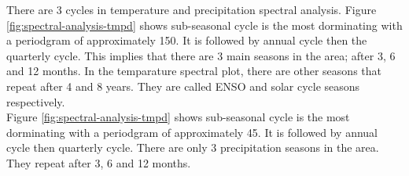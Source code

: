 \documentclass[12pt,a4paper]{article}
\begin{document}
\noindent There are 3 cycles in temperature and precipitation spectral analysis.
Figure \ref{fig:spectral-analysis-tmpd} shows sub-seasonal cycle is the most dorminating with a periodgram of approximately 150. It is followed by annual cycle then the quarterly cycle. This implies that there are 3 main seasons in the area; after 3, 6 and 12 months. In the temparature spectral plot, there are other seasons that repeat after 4 and 8 years. They are called ENSO and solar cycle seasons respectively.\\

\noindent Figure \ref{fig:spectral-analysis-tmpd} shows sub-seasonal cycle is the most dorminating with a periodgram of approximately 45. It is followed by annual cycle then quarterly cycle. There are only 3 precipitation seasons in the area. They repeat after 3, 6 and 12 months.
\newpage
\end{document}
